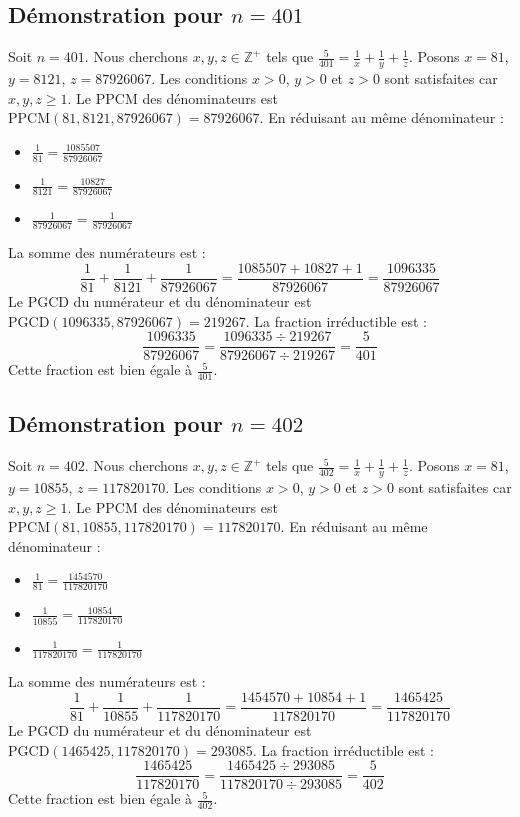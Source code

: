 \documentclass[11pt,a4paper]{article}
\begin{document}
\subsection{Démonstration pour $n = 401$}
Soit $n = 401$. Nous cherchons $x, y, z \in \mathbb{Z}^{+}$ tels que $\frac{5}{401} = \frac{1}{x} + \frac{1}{y} + \frac{1}{z}$.
Posons $x = 81$, $y = 8121$, $z = 87926067$.
Les conditions $x > 0$, $y > 0$ et $z > 0$ sont satisfaites car $x, y, z \geq 1$.
Le PPCM des dénominateurs est $\text{PPCM}(81, 8121, 87926067) = 87926067$.
En réduisant au même dénominateur :
\begin{itemize}
    \item $\frac{1}{81} = \frac{1085507}{87926067}$
    \item $\frac{1}{8121} = \frac{10827}{87926067}$
    \item $\frac{1}{87926067} = \frac{1}{87926067}$
\end{itemize}
La somme des numérateurs est :
$$ \frac{1}{81} + \frac{1}{8121} + \frac{1}{87926067} = \frac{1085507 + 10827 + 1}{87926067} = \frac{1096335}{87926067} $$
Le PGCD du numérateur et du dénominateur est $\text{PGCD}(1096335, 87926067) = 219267$.
La fraction irréductible est :
$$ \frac{1096335}{87926067} = \frac{1096335 \div 219267}{87926067 \div 219267} = \frac{5}{401} $$
Cette fraction est bien égale à $\frac{5}{401}$.

\subsection{Démonstration pour $n = 402$}
Soit $n = 402$. Nous cherchons $x, y, z \in \mathbb{Z}^{+}$ tels que $\frac{5}{402} = \frac{1}{x} + \frac{1}{y} + \frac{1}{z}$.
Posons $x = 81$, $y = 10855$, $z = 117820170$.
Les conditions $x > 0$, $y > 0$ et $z > 0$ sont satisfaites car $x, y, z \geq 1$.
Le PPCM des dénominateurs est $\text{PPCM}(81, 10855, 117820170) = 117820170$.
En réduisant au même dénominateur :
\begin{itemize}
    \item $\frac{1}{81} = \frac{1454570}{117820170}$
    \item $\frac{1}{10855} = \frac{10854}{117820170}$
    \item $\frac{1}{117820170} = \frac{1}{117820170}$
\end{itemize}
La somme des numérateurs est :
$$ \frac{1}{81} + \frac{1}{10855} + \frac{1}{117820170} = \frac{1454570 + 10854 + 1}{117820170} = \frac{1465425}{117820170} $$
Le PGCD du numérateur et du dénominateur est $\text{PGCD}(1465425, 117820170) = 293085$.
La fraction irréductible est :
$$ \frac{1465425}{117820170} = \frac{1465425 \div 293085}{117820170 \div 293085} = \frac{5}{402} $$
Cette fraction est bien égale à $\frac{5}{402}$.
\end{document}
